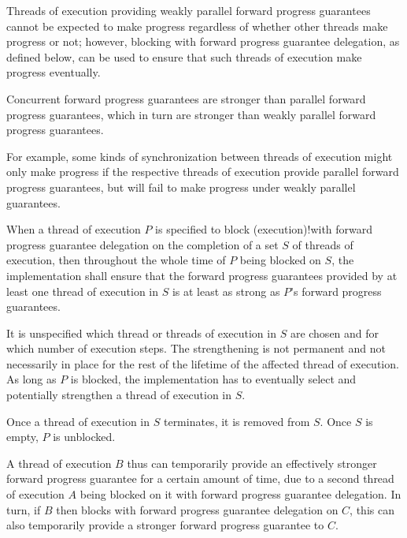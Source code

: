 \pnum
\begin{note}
Threads of execution providing weakly parallel forward progress guarantees cannot
be expected to make progress regardless of whether other threads make progress or
not; however, blocking with forward progress guarantee delegation, as defined below,
can be used to ensure that such threads of execution make progress eventually.
\end{note}

\pnum
Concurrent forward progress guarantees are stronger than parallel forward progress
guarantees, which in turn are stronger than weakly parallel forward progress
guarantees.
\begin{note}
For example, some kinds of synchronization between threads of execution might only
make progress if the respective threads of execution provide parallel forward progress
guarantees, but will fail to make progress under weakly parallel guarantees.
\end{note}

\pnum
{}%
When a thread of execution $P$ is specified to
{block (execution)!with forward progress guarantee delegation}
on the completion of a set $S$ of threads of execution,
then throughout the whole time of $P$ being blocked on $S$,
the implementation shall ensure that the forward progress guarantees
provided by at least one thread of execution in $S$
is at least as strong as $P$'s forward progress guarantees.
\begin{note}
It is unspecified which thread or threads of execution in $S$ are chosen
and for which number of execution steps. The strengthening is not permanent and
not necessarily in place for the rest of the lifetime of the affected thread of
execution. As long as $P$ is blocked, the implementation has to eventually
select and potentially strengthen a thread of execution in $S$.
\end{note}
Once a thread of execution in $S$ terminates, it is removed from $S$.
Once $S$ is empty, $P$ is unblocked.

\pnum
\begin{note}
A thread of execution $B$ thus can temporarily provide an effectively
stronger forward progress guarantee for a certain amount of time, due to a
second thread of execution $A$ being blocked on it with forward
progress guarantee delegation. In turn, if $B$ then blocks with
forward progress guarantee delegation on $C$, this can also temporarily
provide a stronger forward progress guarantee to $C$.
\end{note}


